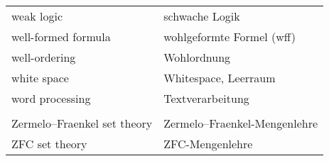 \begin{longtabu}   { @{} X[l] X[l] }
    weak logic & schwache Logik \\
    well-formed formula & wohlgeformte Formel (wff) \\
    well-ordering & Wohlordnung \\
    white space & Whitespace, Leerraum \\
    word processing & Textverarbeitung \\
     & \\
    Zermelo--Fraenkel set theory & Zermelo--Fraenkel-{\allowbreak}Mengenlehre \\
    ZFC set theory & ZFC-Mengenlehre \\    
\end{longtabu}

%
%
%
%
%

\cleardoublepage
{}  %


%

\raggedright
\cleardoublepage
{} %




